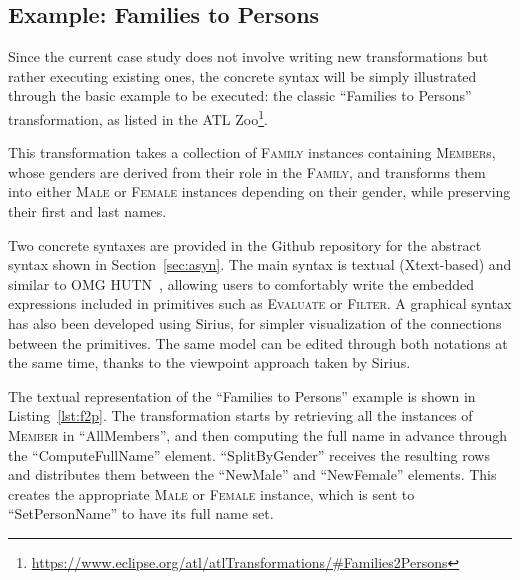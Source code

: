 \documentclass[a4paper]{scrartcl}
\newcommand*{\class}[1]{\textsc{#1}}
\newcommand{\FlowMM}{\emph{FlowM2M}\xspace}
\begin{document}
\subsection{Example: Families to Persons}
\label{sec:f2p}

Since the current case study does not involve writing new
transformations but rather executing existing ones, the concrete
syntax will be simply illustrated through the basic example to be
executed: the classic ``Families to Persons'' transformation, as
listed in the ATL
Zoo\footnote{\url{https://www.eclipse.org/atl/atlTransformations/#Families2Persons}}.

This transformation takes a collection of \class{Family} instances
containing \class{Member}s, whose genders are derived from their role
in the \class{Family}, and transforms them into either \class{Male} or
\class{Female} instances depending on their gender, while preserving
their first and last names.

Two concrete syntaxes are provided in the Github repository for the
abstract syntax shown in Section~\ref{sec:asyn}. The main syntax is
textual (Xtext-based) and similar to OMG HUTN~\cite{hutn2004},
allowing users to comfortably write the embedded expressions included
in primitives such as \class{Evaluate} or \class{Filter}. A graphical
syntax has also been developed using Sirius, for simpler visualization
of the connections between the primitives. The same model can be
edited through both notations at the same time, thanks to the
viewpoint approach taken by Sirius.



The textual representation of the ``Families to Persons'' example is
shown in Listing~\ref{lst:f2p}. The transformation starts by
retrieving all the instances of \class{Member} in ``AllMembers'', and
then computing the full name in advance through the
``ComputeFullName'' element. ``SplitByGender'' receives the resulting
rows and distributes them between the ``NewMale'' and ``NewFemale''
elements. This creates the appropriate \class{Male} or \class{Female}
instance, which is sent to ``SetPersonName'' to have its full name
set.
\end{document}
